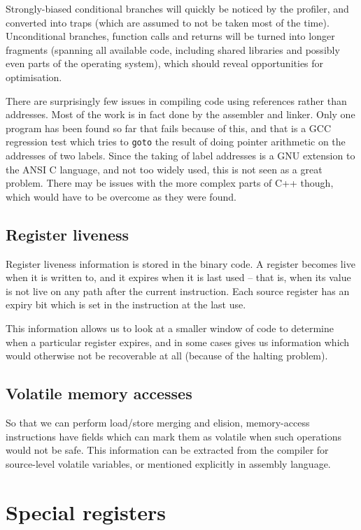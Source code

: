 Strongly-biased conditional branches will quickly be noticed by the profiler, and converted into traps (which are assumed to not be taken most of the time). Unconditional branches, function calls and returns will be turned into longer fragments (spanning all available code, including shared libraries and possibly even parts of the operating system), which should reveal opportunities for optimisation.

There are surprisingly few issues in compiling code using references rather than addresses. Most of the work is in fact done by the assembler and linker. Only one program has been found so far that fails because of this, and that is a GCC regression test which tries to \texttt{goto} the result of doing pointer arithmetic on the addresses of two labels. Since the taking of label addresses is a GNU extension to the ANSI C language, and not too widely used, this is not seen as a great problem. There may be issues with the more complex parts of C++ though, which would have to be overcome as they were found.

\subsection{Register liveness}

Register liveness information is stored in the binary code. A register becomes live when it is written to, and it expires when it is last used -- that is, when its value is not live on any path after the current instruction. Each source register has an expiry bit which is set in the instruction at the last use.

This information allows us to look at a smaller window of code to determine when a particular register expires, and in some cases gives us information which would otherwise not be recoverable at all (because of the halting problem).

\subsection{Volatile memory accesses}

So that we can perform load/store merging and elision, memory-access instructions have fields which can mark them as volatile when such operations would not be safe. This information can be extracted from the compiler for source-level volatile variables, or mentioned explicitly in assembly language.

\section{Special registers}

